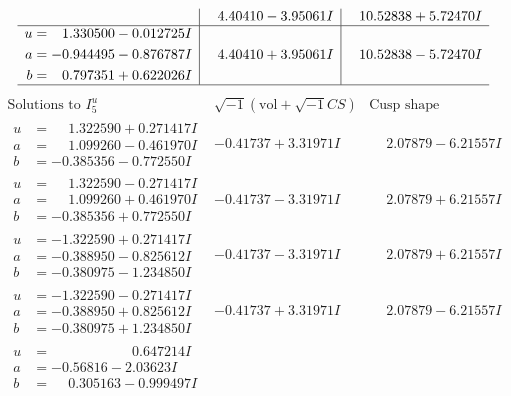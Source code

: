 \documentclass[1p]{elsarticle_modified}
\theoremstyle{definition}
\newcommand{\I}{\sqrt{-1}}
\begin{document}
$$\begin{array}{c|c|c}
 & \phantom{-}4.40410 - 3.95061 I & \phantom{-}10.52838 + 5.72470 I \\ \hline\begin{aligned}
u &= \phantom{-}1.330500 - 0.012725 I \\
a &= -0.944495 - 0.876787 I \\
b &= \phantom{-}0.797351 + 0.622026 I\end{aligned}
 & \phantom{-}4.40410 + 3.95061 I & \phantom{-}10.52838 - 5.72470 I\\
 \hline 
 \end{array}$$\newpage$$\begin{array}{c|c|c}  
\text{Solutions to }I^u_{5}& \I (\text{vol} + \sqrt{-1}CS) & \text{Cusp shape}\\
 \hline 
\begin{aligned}
u &= \phantom{-}1.322590 + 0.271417 I \\
a &= \phantom{-}1.099260 - 0.461970 I \\
b &= -0.385356 - 0.772550 I\end{aligned}
 & -0.41737 + 3.31971 I & \phantom{-}2.07879 - 6.21557 I \\ \hline\begin{aligned}
u &= \phantom{-}1.322590 - 0.271417 I \\
a &= \phantom{-}1.099260 + 0.461970 I \\
b &= -0.385356 + 0.772550 I\end{aligned}
 & -0.41737 - 3.31971 I & \phantom{-}2.07879 + 6.21557 I \\ \hline\begin{aligned}
u &= -1.322590 + 0.271417 I \\
a &= -0.388950 - 0.825612 I \\
b &= -0.380975 - 1.234850 I\end{aligned}
 & -0.41737 - 3.31971 I & \phantom{-}2.07879 + 6.21557 I \\ \hline\begin{aligned}
u &= -1.322590 - 0.271417 I \\
a &= -0.388950 + 0.825612 I \\
b &= -0.380975 + 1.234850 I\end{aligned}
 & -0.41737 + 3.31971 I & \phantom{-}2.07879 - 6.21557 I \\ \hline\begin{aligned}
u &= \phantom{-0.000000 -}0.647214 I \\
a &= -0.56816 - 2.03623 I \\
b &= \phantom{-}0.305163 - 0.999497 I\end{aligned}

\end{array}$$
\end{document}
